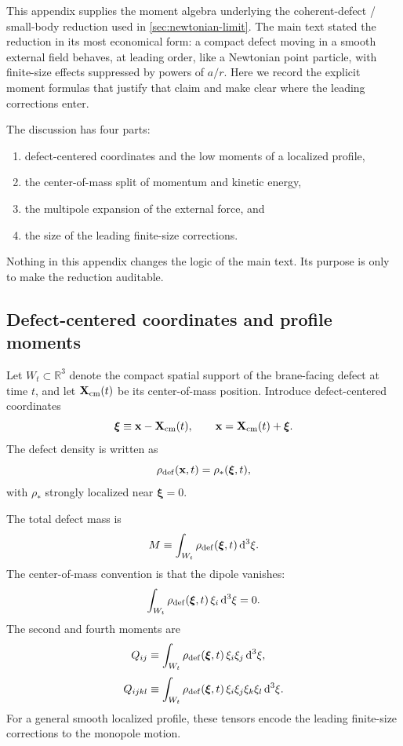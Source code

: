 \documentclass[11pt]{article}
\newcommand{\dd}{\mathrm d}
\newcommand{\x}{\mathbf x}
\begin{document}
This appendix supplies the moment algebra underlying the coherent-defect / small-body
reduction used in \cref{sec:newtonian-limit}. The main text stated the reduction in its
most economical form: a compact defect moving in a smooth external field behaves, at
leading order, like a Newtonian point particle, with finite-size effects suppressed by
powers of \(a/r\). Here we record the explicit moment formulas that justify that claim and
make clear where the leading corrections enter.

The discussion has four parts:
\begin{enumerate}[leftmargin=1.5em]
  \item defect-centered coordinates and the low moments of a localized profile,
  \item the center-of-mass split of momentum and kinetic energy,
  \item the multipole expansion of the external force, and
  \item the size of the leading finite-size corrections.
\end{enumerate}
Nothing in this appendix changes the logic of the main text. Its purpose is only to make
the reduction auditable.

\subsection{Defect-centered coordinates and profile moments}
\label{app:moments-profile}

Let \(W_t\subset \mathbb R^3\) denote the compact spatial support of the brane-facing
defect at time \(t\), and let \(\mathbf X_{\rm cm}(t)\) be its center-of-mass position.
Introduce defect-centered coordinates
\begin{equation}
\boldsymbol{\xi}\equiv \x-\mathbf X_{\rm cm}(t),
\qquad
\x=\mathbf X_{\rm cm}(t)+\boldsymbol{\xi}.
\label{eq:app-xi-def}
\end{equation}
The defect density is written as
\begin{equation}
\rho_{\rm def}(\x,t)=\rho_*(\boldsymbol{\xi},t),
\label{eq:app-rho-star}
\end{equation}
with \(\rho_*\) strongly localized near \(\boldsymbol{\xi}=0\).

The total defect mass is
\begin{equation}
M\equiv \int_{W_t}\rho_{\rm def}(\boldsymbol{\xi},t)\,\dd^3\xi.
\label{eq:app-M-def}
\end{equation}
The center-of-mass convention is that the dipole vanishes:
\begin{equation}
\int_{W_t}\rho_{\rm def}(\boldsymbol{\xi},t)\,\xi_i\,\dd^3\xi=0.
\label{eq:app-dipole-zero}
\end{equation}
The second and fourth moments are
\begin{align}
Q_{ij}
&\equiv
\int_{W_t}\rho_{\rm def}(\boldsymbol{\xi},t)\,\xi_i\xi_j\,\dd^3\xi,
\label{eq:app-Qij}
\\[3pt]
Q_{ijkl}
&\equiv
\int_{W_t}\rho_{\rm def}(\boldsymbol{\xi},t)\,\xi_i\xi_j\xi_k\xi_l\,\dd^3\xi.
\label{eq:app-Qijkl}
\end{align}
For a general smooth localized profile, these tensors encode the leading finite-size
corrections to the monopole motion.
\end{document}
